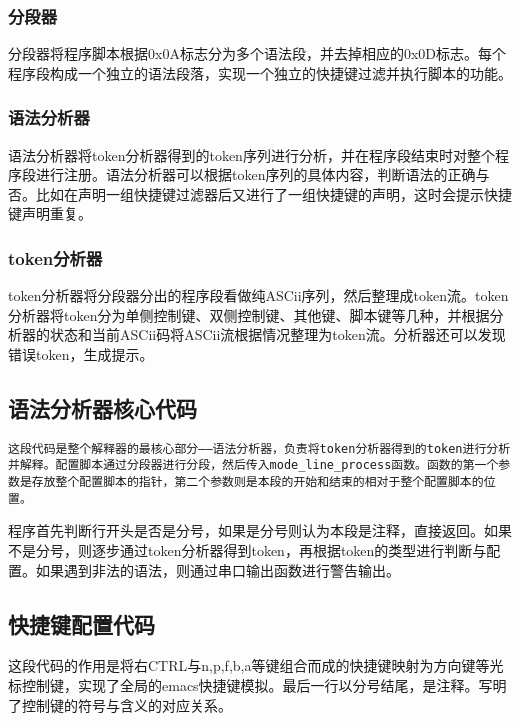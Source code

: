 \subsubsection{  分段器}

分段器将程序脚本根据0x0A标志分为多个语法段，并去掉相应的0x0D标志。每个程序段构成一个独立的语法段落，实现一个独立的快捷键过滤并执行脚本的功能。

\subsubsection{ 语法分析器}

语法分析器将token分析器得到的token序列进行分析，并在程序段结束时对整个程序段进行注册。语法分析器可以根据token序列的具体内容，判断语法的正确与否。比如在声明一组快捷键过滤器后又进行了一组快捷键的声明，这时会提示快捷键声明重复。

\subsubsection{  token分析器}

token分析器将分段器分出的程序段看做纯ASCii序列，然后整理成token流。token分析器将token分为单侧控制键、双侧控制键、其他键、脚本键等几种，并根据分析器的状态和当前ASCii码将ASCii流根据情况整理为token流。分析器还可以发现错误token，生成提示。
\subsection{语法分析器核心代码}
\verb|这段代码是整个解释器的最核心部分——语法分析器，负责将token分析器得到的token进行分析并解释。配置脚本通过分段器进行分段，然后传入mode_line_process函数。函数的第一个参数是存放整个配置脚本的指针，第二个参数则是本段的开始和结束的相对于整个配置脚本的位置。|

程序首先判断行开头是否是分号，如果是分号则认为本段是注释，直接返回。如果不是分号，则逐步通过token分析器得到token，再根据token的类型进行判断与配置。如果遇到非法的语法，则通过串口输出函数进行警告输出。


\subsection{快捷键配置代码}
这段代码的作用是将右CTRL与n,p,f,b,a等键组合而成的快捷键映射为方向键等光标控制键，实现了全局的emacs快捷键模拟。最后一行以分号结尾，是注释。写明了控制键的符号与含义的对应关系。





